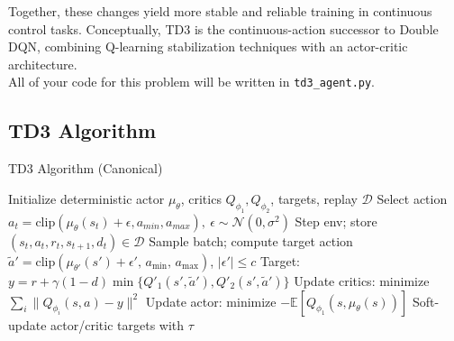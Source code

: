 \documentclass[12pt]{article}
\begin{document}
Together, these changes yield more stable and reliable training in continuous control tasks. Conceptually, TD3 is the continuous-action successor to Double DQN, combining Q-learning stabilization techniques with an actor-critic architecture. \\
\noindent
All of your code for this problem will be written in \texttt{td3\_agent.py}.

\subsection*{TD3 Algorithm}
\begin{algorithm}
\caption{TD3 Algorithm (Canonical)}
\begin{algorithmic}[1]
\State Initialize deterministic actor \(\mu_\theta\), critics \(Q_{\phi_1},Q_{\phi_2}\), targets, replay \(\mathcal{D}\)
  \State Select action \(a_t=\text{clip}(\mu_\theta(s_t)+\epsilon, a_{min},a_{max}),\ \epsilon\sim\mathcal{N}(0,\sigma^2)\)
  \State Step env; store \((s_t,a_t,r_t,s_{t+1},d_t)\in\mathcal{D}\)
    \State Sample batch; compute target action \(\tilde a' = \text{clip}(\mu_{\theta'}(s')+\epsilon',\, a_{\min},\, a_{\max})\), \(|\epsilon'|\le c\)
    \State Target: \(y=r+\gamma(1-d)\min\{Q'_{1}(s',\tilde a'),Q'_{2}(s',\tilde a')\}\)
    \State Update critics: minimize \(\sum_i \|Q_{\phi_i}(s,a)-y\|^2\)
      \State Update actor: minimize \(-\mathbb{E}[Q_{\phi_1}(s, \mu_\theta(s))]\)
      \State Soft-update actor/critic targets with \(\tau\)
    \EndIf
  \EndIf
\EndFor
\end{algorithmic}
\end{algorithm}



\end{document}
